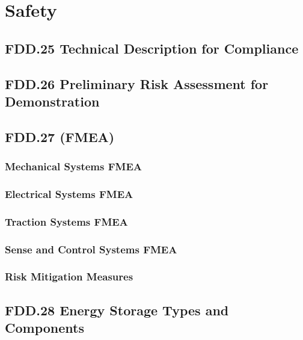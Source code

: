 \chapter{Safety}

\section{FDD.25 Technical Description for Compliance}

\section{FDD.26 Preliminary Risk Assessment for Demonstration}

\section{FDD.27 (FMEA)}
\subsection{Mechanical Systems FMEA}
\subsection{Electrical Systems FMEA}
\subsection{Traction Systems FMEA}
\subsection{Sense and Control Systems FMEA}
\subsection{Risk Mitigation Measures}

\section{FDD.28 Energy Storage Types and Components}

